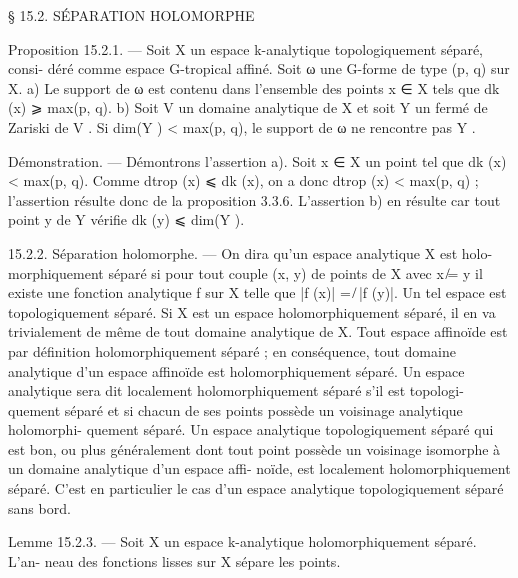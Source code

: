 \documentclass[
  10pt,
]{article}
\newenvironment{Shaded}{}{}
\newcommand{\NormalTok}[1]{#1}
\begin{document}
\begin{Shaded}
\begin{Highlighting}[]
\NormalTok{                      § 15.2. SÉPARATION HOLOMORPHE}

\NormalTok{Proposition 15.2.1. — Soit X un espace k{-}analytique topologiquement séparé, consi{-}}
\NormalTok{déré comme espace G{-}tropical affiné. Soit ω une G{-}forme de type (p, q) sur X.}
\NormalTok{  a) Le support de ω est contenu dans l’ensemble des points x ∈ X tels que dk (x) ⩾}
\NormalTok{max(p, q).}
\NormalTok{  b) Soit V un domaine analytique de X et soit Y un fermé de Zariski de V . Si}
\NormalTok{dim(Y ) \textless{} max(p, q), le support de ω ne rencontre pas Y .}

\NormalTok{Démonstration. — Démontrons l’assertion a). Soit x ∈ X un point tel que dk (x) \textless{}}
\NormalTok{max(p, q). Comme dtrop (x) ⩽ dk (x), on a donc dtrop (x) \textless{} max(p, q) ; l’assertion résulte}
\NormalTok{donc de la proposition 3.3.6.}
\NormalTok{  L’assertion b) en résulte car tout point y de Y vérifie dk (y) ⩽ dim(Y ).}

\NormalTok{15.2.2. Séparation holomorphe. — On dira qu’un espace analytique X est holo{-}}
\NormalTok{morphiquement séparé si pour tout couple (x, y) de points de X avec x ̸= y il existe une}
\NormalTok{fonction analytique f sur X telle que |f (x)| =}
\NormalTok{                                              ̸ |f (y)|. Un tel espace est topologiquement}
\NormalTok{séparé.}
\NormalTok{  Si X est un espace holomorphiquement séparé, il en va trivialement de même de tout}
\NormalTok{domaine analytique de X.}
\NormalTok{  Tout espace affinoïde est par définition holomorphiquement séparé ; en conséquence,}
\NormalTok{tout domaine analytique d’un espace affinoïde est holomorphiquement séparé.}
\NormalTok{  Un espace analytique sera dit localement holomorphiquement séparé s’il est topologi{-}}
\NormalTok{quement séparé et si chacun de ses points possède un voisinage analytique holomorphi{-}}
\NormalTok{quement séparé.}
\NormalTok{  Un espace analytique topologiquement séparé qui est bon, ou plus généralement dont}
\NormalTok{tout point possède un voisinage isomorphe à un domaine analytique d’un espace affi{-}}
\NormalTok{noïde, est localement holomorphiquement séparé. C’est en particulier le cas d’un espace}
\NormalTok{analytique topologiquement séparé sans bord.}

\NormalTok{Lemme 15.2.3. — Soit X un espace k{-}analytique holomorphiquement séparé. L’an{-}}
\NormalTok{neau des fonctions lisses sur X sépare les points.}


\end{Highlighting}
\end{Shaded}
\end{document}

